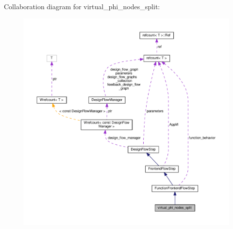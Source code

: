 Collaboration diagram for virtual\+\_\+phi\+\_\+nodes\+\_\+split\+:
\nopagebreak
\begin{figure}[H]
\begin{center}
\leavevmode
\includegraphics[width=350pt]{d1/d8e/classvirtual__phi__nodes__split__coll__graph}
\end{center}
\end{figure}
